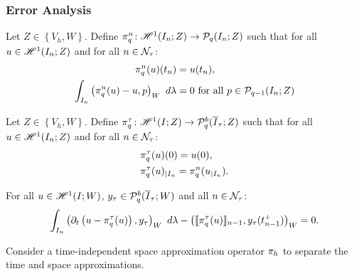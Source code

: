 \subsubsection{Error Analysis}

\begin{definition}[$\InterpolantQN$]
    Let $Z \in \left\{V_h, W\right\}$. Define $\pi^n_q \colon \mathscr{H}^{1}(I_n; Z) \rightarrow \mathcal{P}_{q}(I_n; Z)$ such that for all $u \in \mathscr{H}^{1}(I_n; Z)$ and for all $n \in \mathcal{N}_{\tau}$:
    \begin{align}
        \pi^n_q(u)(t_n) & = u(t_n), \\
        \int_{I_n} \left( \pi^n_q(u) - u, p \right)_W ~ d \lambda & = 0 \text{ for all } p \in \mathcal{P}_{q - 1}(I_n; Z)
    \end{align}
\end{definition}

\begin{definition}[$\InterpolantQT$]
    Let $Z \in \left\{V_h, W\right\}$. Define $\pi^{\tau}_q \colon \mathscr{H}^{1}(I; Z) \rightarrow \mathcal{P}_{q}^b(\overline{I}_{\tau}; Z)$ such that for all $u \in \mathscr{H}^{1}(I_n; Z)$ and for all $n \in \mathcal{N}_{\tau}$:
    \begin{align}
        & \pi^{\tau}_q(u)(0) = u(0), \\
        & \pi^{\tau}_q(u)_{\mid I_n} = \pi^n_q(u_{\mid I_n}).
    \end{align}
\end{definition}

\begin{lemma}[Orthogonality]
    For all $u \in \mathscr{H}^{1}(I; W)$, $y_{\tau} \in \mathcal{P}_{q}^b(\overline{I}_{\tau}; W)$ and all $n \in \mathcal{N}_{\tau}$:
    \begin{gather}
        \int_{I_n} \left( \partial_t \left( u - \pi^{\tau}_q(u) \right), y_{\tau} \right)_W ~ d \lambda - \left( \llbracket \pi^{\tau}_q(u) \rrbracket_{n - 1}, y_{\tau}(t_{n - 1}^+) \right)_W = 0.
    \end{gather}
\end{lemma}

Consider a time-independent space approximation operator $\pi_h$ to separate the time and space approximations.

